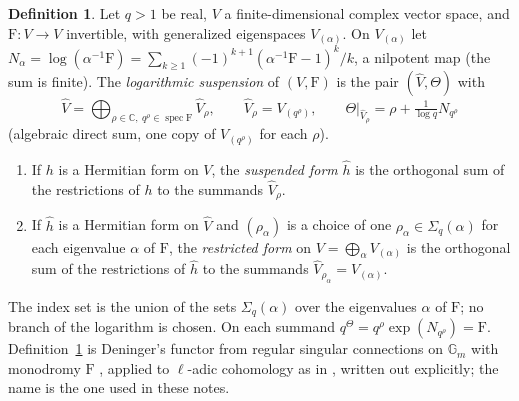 \documentclass[11pt]{amsart}
\theoremstyle{plain}
\theoremstyle{definition}
\newtheorem{definition}[theorem]{Definition}
\theoremstyle{remark}
\numberwithin{equation}{section}
\newcommand{\C}{\mathbb{C}}
\DeclareMathOperator{\spec}{spec}
\begin{document}
\begin{definition}\label{def:log-susp}
Let $q>1$ be real, $V$ a finite-dimensional complex vector space, and
$\mathrm{F}:V\to V$ invertible, with generalized eigenspaces
$V_{(\alpha)}$. On $V_{(\alpha)}$ let
$N_\alpha=\log(\alpha^{-1}\mathrm{F})=\sum_{k\ge1}(-1)^{k+1}
(\alpha^{-1}\mathrm{F}-1)^k/k$, a nilpotent map (the sum is finite).
The \emph{logarithmic suspension} of $(V,\mathrm{F})$ is the pair
$(\widehat V,\Theta)$ with
\[
\widehat V=\bigoplus_{\rho\in\C,\ q^\rho\in\spec\mathrm{F}}
\widehat V_\rho,\qquad\widehat V_\rho=V_{(q^\rho)},\qquad
\Theta|_{\widehat V_\rho}=\rho+\tfrac1{\log q}N_{q^\rho}
\]
(algebraic direct sum, one copy of $V_{(q^\rho)}$ for each $\rho$).
\begin{enumerate}[label=(\alph*)]
\item If $h$ is a Hermitian form on $V$, the \emph{suspended form}
  $\widehat h$ is the orthogonal sum of the restrictions of $h$ to the
  summands $\widehat V_\rho$.
\item If $\widehat h$ is a Hermitian form on $\widehat V$ and
  $(\rho_\alpha)$ is a choice of one $\rho_\alpha\in\Sigma_q(\alpha)$
  for each eigenvalue $\alpha$ of $\mathrm{F}$, the \emph{restricted
  form} on $V=\bigoplus_\alpha V_{(\alpha)}$ is the orthogonal sum of
  the restrictions of $\widehat h$ to the summands
  $\widehat V_{\rho_\alpha}=V_{(\alpha)}$.
\end{enumerate}
\end{definition}

The index set is the union of the sets $\Sigma_q(\alpha)$ over the
eigenvalues $\alpha$ of $\mathrm{F}$; no branch of the logarithm is
chosen. On each summand $q^\Theta=q^\rho\exp(N_{q^\rho})=\mathrm{F}$.
Definition~\ref{def:log-susp} is Deninger's functor from regular
singular connections on $\mathbb{G}_m$ with monodromy $\mathrm{F}$
\cite[\S2, pp.~6--8]{Deninger1994Motivic}, applied to $\ell$-adic
cohomology as in \cite[\S4, p.~16]{Deninger1994Motivic}, written out
explicitly; the name is the one used in these notes.
\end{document}
